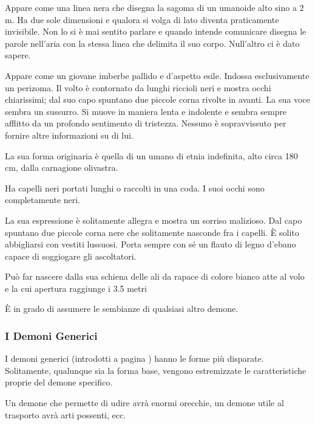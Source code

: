  Appare
come una linea nera che disegna la sagoma di un umanoide alto sino a 2
m. Ha due sole dimensioni e qualora si volga di lato diventa
praticamente invisibile. Non lo si \`e mai sentito parlare e quando
intende comunicare disegna le parole nell'aria con la stessa linea che
delimita il suo corpo. Null'altro ci \`e dato sapere.

 Appare come un
giovane imberbe pallido e d'aspetto esile. Indossa esclusivamente un
perizoma. Il volto \`e contornato da lunghi riccioli neri e mostra
occhi chiarissimi; dal suo capo spuntano due piccole corna rivolte in
avanti. La sua voce sembra un sussurro. Si muove in maniera lenta e
indolente e sembra sempre afflitto da un profondo sentimento di
tristezza. Nessuno \`e sopravvissuto per fornire altre informazioni
su di lui.


La sua forma originaria \`e quella di un umano di etnia indefinita,
alto circa 180 cm, dalla carnagione olivastra.

Ha capelli neri portati lunghi o raccolti in una coda.  I suoi occhi
sono completamente neri.

La sua espressione \`e solitamente allegra e mostra un sorriso
malizioso. Dal capo spuntano due piccole corna nere che solitamente
nasconde fra i capelli. \`E solito abbigliarsi con vestiti lussuosi.
Porta sempre con s\'e un flauto di legno d'ebano capace di soggiogare
gli ascoltatori.

Pu\`o far nascere dalla sua schiena delle ali da rapace di colore
bianco atte al volo e la cui apertura raggiunge i 3.5 metri

\`E in grado di assumere le sembianze di qualsiasi altro demone. 

\subsubsection{I Demoni Generici}
\label{demonigenerici}

I demoni generici (introdotti a pagina \pageref{incantesimidemoni}) hanno le
forme pi\`u disparate. Solitamente, qualunque sia la forma base, vengono
estremizzate le caratteristiche proprie del demone specifico. 


Un demone che permette di udire avr\`a enormi orecchie, un demone
utile al trasporto avr\`a arti possenti, ecc.


